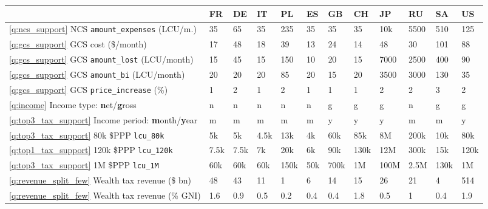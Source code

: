 
\begin{tabular}{llllllllllll}
\toprule
  & FR & DE & IT & PL & ES & GB & CH & JP & RU & SA & US\\
\midrule
\ref{q:ncs_support} NCS \verb|amount_expenses| (LCU/m.) & 35 & 65 & 35 & 235 & 35 & 35 & 35 & 10k & 5500 & 510 & 125\\
\ref{q:gcs_support} GCS cost (\$/month) & 17 & 48 & 18 & 39 & 13 & 24 & 14 & 48 & 30 & 101 & 88\\
\ref{q:gcs_support} GCS \verb|amount_lost| (LCU/month) & 15 & 45 & 15 & 150 & 10 & 20 & 15 & 7000 & 2500 & 400 & 90\\
\ref{q:gcs_support} GCS \verb|amount_bi| (LCU/month) & 20 & 20 & 20 & 85 & 20 & 15 & 20 & 3500 & 3000 & 130 & 35\\
\ref{q:gcs_support} GCS \verb|price_increase| (\%) & 1~ & 2 & 1 & 2 & 1 & 1 & 1 & 2 & 2 & 3 & 2\\
\addlinespace
\ref{q:income} Income type: \textbf{n}et/\textbf{g}ross & n & n & n & n & n & g & g & g & n & g & g\\
\ref{q:top3_tax_support} Income period: \textbf{m}onth/\textbf{y}ear & m & m & m & m & m & y & y & y & m & m & y\\
\ref{q:top3_tax_support} 80k \$PPP \verb|lcu_80k| & 5k & 5k & 4.5k & 13k & 4k & 60k & 85k & 8M & 200k & 10k & 80k\\
\ref{q:top1_tax_support} 120k \$PPP \verb|lcu_120k| & 7.5k & 7.5k & 7k & 20k & 6k & 90k & 130k & 12M & 300k & 15k & 120k\\
\ref{q:top3_tax_support} 1M \$PPP \verb|lcu_1M| & 60k & 60k & 60k & 150k & 50k & 700k & 1M & 100M & 2.5M & 130k & 1M\\
\addlinespace
\ref{q:revenue_split_few} Wealth tax revenue (\$ bn) & 48 & 43 & 11 & 1 & 6 & 14 & 15 & 26 & 21 & 4 & 514\\
\ref{q:revenue_split_few} Wealth tax revenue (\% GNI) & 1.6 & 0.9 & 0.5 & 0.2 & 0.4 & 0.4 & 1.8 & 0.5 & 1 & 0.4 & 1.9\\
\bottomrule
\end{tabular}
